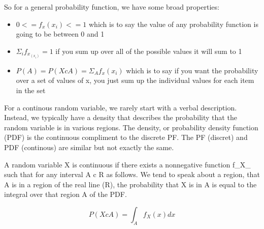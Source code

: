 \documentclass[]{book}
\providecommand{\tightlist}{%
  \setlength{\itemsep}{0pt}\setlength{\parskip}{0pt}}
\theoremstyle{definition}
\theoremstyle{definition}
\theoremstyle{definition}
\theoremstyle{remark}
\begin{document}
So for a general probability function, we have some broad properties:

\begin{itemize}
\tightlist
\item
  \(0 <= f_x(x_i) <= 1\) which is to say the value of any probability
  function is going to be between 0 and 1
\item
  \(Σ_i f_x_ (x_i) = 1\) if you sum up over all of the possible values
  it will sum to 1
\item
  \(P(A) = P(XcA) = Σ_Af_x(x_i)\) which is to say if you want the
  probability over a set of values of x, you just sum up the individual
  values for each item in the set
\end{itemize}

For a continous random variable, we rarely start with a verbal
description. Instead, we typically have a density that describes the
probability that the random variable is in various regions. The density,
or probability density function (PDF) is the continuous compliment to
the discrete PF. The PF (discret) and PDF (continous) are similar but
not exactly the same.

A random variable X is continuous if there exists a nonnegative function
f\_X\_ such that for any interval A c R as follows. We tend to speak
about a region, that A is in a region of the real line (R), the
probability that X is in A is equal to the integral over that region A
of the PDF.

\[P(X c A) = \int_{A} f_X(x)dx\]


\end{document}
